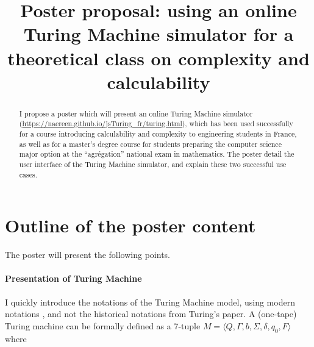 \documentclass[runningheads]{llncs}
\begin{document}
%
\title{Poster proposal: using an online Turing Machine simulator for a theoretical class on complexity and calculability}%
%
%
\maketitle              %
%
\begin{abstract}
    I propose a poster which will present an online Turing Machine simulator (\url{https://naereen.github.io/jsTuring_fr/turing.html}),
    which has been used successfully for a course introducing calculability and complexity to engineering students in France,
    as well as for a master's degree course for students preparing the computer science major option at the ``agr{\'e}gation'' national exam in mathematics.
    The poster detail the user interface of the Turing Machine simulator, and explain these two successful use cases.
\end{abstract}
%
%
%

\section{Outline of the poster content}

The poster will present the following points.

\paragraph{Presentation of Turing Machine}

I quickly introduce the notations of the Turing Machine model, using modern notations \cite{turingmachine}, and not the historical notations from Turing's paper.
%
A (one-tape) Turing machine can be formally defined as a 7-tuple $M=\langle Q,\Gamma ,b,\Sigma ,\delta ,q_{0},F\rangle$ where
\end{document}
